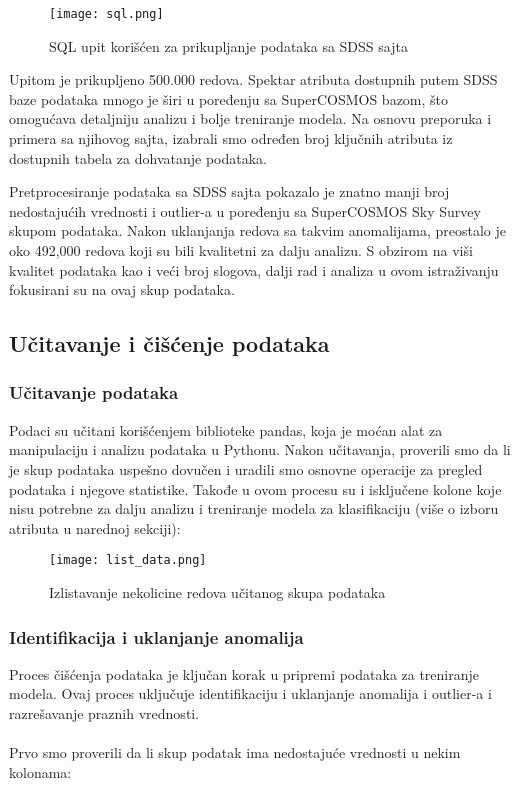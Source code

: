 \documentclass[a4paper,12pt]{article}
\begin{document}
\begin{figure}[H]
\centering
\texttt{[image: sql.png]}
\caption{SQL upit korišćen za prikupljanje podataka sa SDSS sajta}
\label{fig:sql_query}
\end{figure}

Upitom je prikupljeno 500.000 redova. Spektar atributa dostupnih putem SDSS baze podataka mnogo je širi u poređenju sa SuperCOSMOS bazom, što omogućava detaljniju analizu i bolje treniranje modela. Na osnovu preporuka i primera sa njihovog sajta, izabrali smo određen broj ključnih atributa iz dostupnih tabela za dohvatanje podataka.

Pretprocesiranje podataka sa SDSS sajta pokazalo je znatno manji broj nedostajućih vrednosti i outlier-a u poređenju sa SuperCOSMOS Sky Survey skupom podataka. Nakon uklanjanja redova sa takvim anomalijama, preostalo je oko 492,000 redova koji su bili kvalitetni za dalju analizu. S obzirom na viši kvalitet podataka kao i veći broj slogova, dalji rad i analiza u ovom istraživanju fokusirani su na ovaj skup podataka.

\subsection{Učitavanje i čišćenje podataka}


\subsubsection{Učitavanje podataka}
Podaci su učitani korišćenjem biblioteke pandas, koja je moćan alat za manipulaciju i analizu podataka u Pythonu. Nakon učitavanja, proverili smo da li je skup podataka uspešno dovučen i uradili smo osnovne operacije za pregled podataka i njegove statistike. Takođe u ovom procesu su i isključene kolone koje nisu potrebne za dalju analizu i treniranje modela za klasifikaciju (više o izboru atributa u narednoj sekciji):

\begin{figure}[H]
\centering
\texttt{[image: list\_data.png]}
\caption{Izlistavanje nekolicine redova učitanog skupa podataka}
\label{fig:sql_query}
\end{figure}

\subsubsection{Identifikacija i uklanjanje anomalija}
Proces čišćenja podataka je ključan korak u pripremi podataka za treniranje modela. Ovaj proces uključuje identifikaciju i uklanjanje anomalija i outlier-a i razrešavanje praznih vrednosti.\\\\
Prvo smo proverili da li skup podatak ima nedostajuće vrednosti u nekim kolonama:
\end{document}
